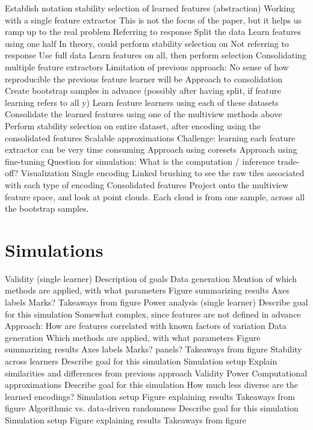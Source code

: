 \documentclass[11pt]{article}
\begin{document}
\begin{outline}
\1 Establish notation
\1 stability selection of learned features (abstraction)
  \2 Working with a single feature extractor
    \3 This is not the focus of the paper, but it helps us ramp up to the real
    problem
    \3 Referring to response
      \4 Split the data
      \4 Learn features using one half
      \4 In theory, could perform stability selection on
    \3 Not referring to response
      \4 Use full data
      \4 Learn features on all, then perform selection
  \2 Consolidating multiple feature extractors
    \3 Limitation of previous approach: No sense of how reproducible the
    previous feature learner will be
    \3 Approach to consolidation
      \4 Create bootstrap samples in advance (possibly after having split, if feature learning refers to all y)
      \4 Learn feature learners using each of these datasets
      \4 Consolidate the learned features using one of the multiview methods above
      \4 Perform stability selection on entire dataset, after encoding using the consolidated features
\1 Scalable approximations
  \2 Challenge: learning each feature extractor can be very time consuming
  \2 Approach using coresets
  \2 Approach using fine-tuning
  \2 Question for simulation: What is the computation / inference trade-off?
\1 Visualization
  \2 Single encoding
    \3 Linked brushing to see the raw tiles associated with each type of encoding
  \2 Consolidated features
    \3 Project onto the multiview feature space, and look at point clouds. Each
    cloud is from one sample, across all the bootstrap samples.
\end{outline}

\section{Simulations}

\begin{outline}
  \1 Validity (single learner)
    \2 Description of goals
    \2 Data generation
    \2 Mention of which methods are applied, with what parameters
    \2 Figure summarizing results
      \3 Axes labels
      \3 Marks?
    \2 Takeaways from figure
  \1 Power analysis (single learner)
    \2 Describe goal for this simulation
    \2 Somewhat complex, since features are not defined in advance
    \2 Approach: How are features correlated with known factors of variation
    \2 Data generation
    \2 Which methods are applied, with what parameters
    \2 Figure summarizing results
      \3 Axes labels
      \3 Marks?
      \3 panels?
    \2 Takeaways from figure
  \1 Stability across learners
    \2 Describe goal for this simulation
    \2 Simulation setup
      \3 Explain similarities and differences from previous approach
      \3 Validity
      \3 Power
  \1 Computational approximations
    \2 Describe goal for this simulation
    \2 How much less diverse are the learned encodings?
    \2 Simulation setup
    \2 Figure explaining results
    \2 Takeaways from figure
  \1 Algorithmic vs. data-driven randomness
    \2 Describe goal for this simulation
    \2 Simulation setup
    \2 Figure explaining results
    \2 Takeaways from figure
\end{outline}
\end{document}
